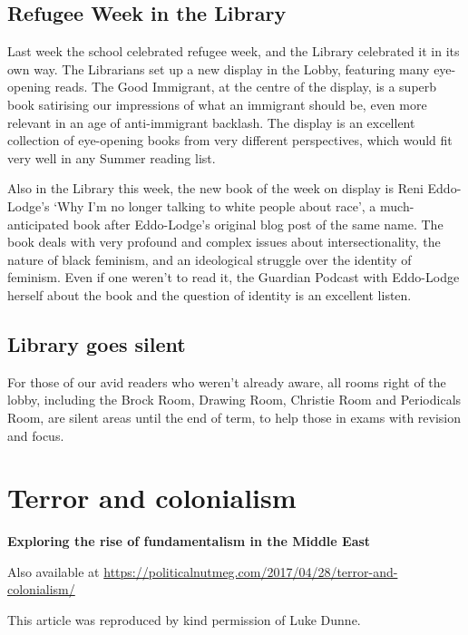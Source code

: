 \documentclass[10pt,a4paper]{article}
\begin{document}
\begin{multicols}{2}
\subsection{Refugee Week in the Library}

Last week the school celebrated refugee week, and the Library celebrated it in its own way. The Librarians set up a new display in the Lobby, featuring many eye-opening reads. The Good Immigrant, at the centre of the display, is a superb book satirising our impressions of what an immigrant should be, even more relevant in an age of anti-immigrant backlash. The display is an excellent collection of eye-opening books from very different perspectives, which would fit very well in any Summer reading list.

Also in the Library this week, the new book of the week on display is Reni Eddo-Lodge’s ‘Why I'm no longer talking to white people about race’, a much-anticipated book after Eddo-Lodge’s original blog post of the same name. The book deals with very profound and complex issues about intersectionality, the nature of black feminism, and an ideological struggle over the identity of feminism. Even if one weren’t to read it, the Guardian Podcast with Eddo-Lodge herself about the book and the question of identity is an excellent listen.

\subsection{Library goes silent}

For those of our avid readers who weren’t already aware, all rooms right of the lobby, including the Brock Room, Drawing Room, Christie Room and Periodicals Room, are silent areas until the end of term, to help those in exams with revision and focus.

\end{multicols}

\pagebreak

\section{Terror and colonialism}
\vspace{-1.25em}
\textbf{Exploring the rise of fundamentalism in the Middle East}

Also available at \url{https://politicalnutmeg.com/2017/04/28/terror-and-colonialism/}

This article was reproduced by kind permission of Luke Dunne.
\end{document}
